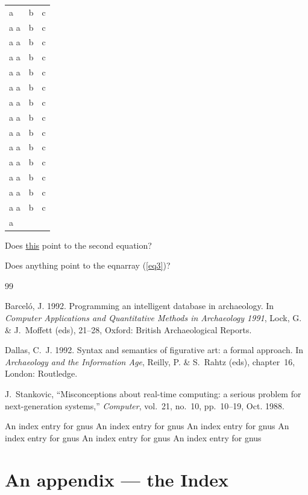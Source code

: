 \documentclass[11pt]{book}
\begin{document}
\begin{longtable}{lll}
a & b & c \\a
a & b & c \\a
a & b & c \\a
a & b & c \\a
a & b & c \\a
a & b & c \\a
a & b & c \\a
a & b & c \\a
a & b & c \\a
a & b & c \\a
a & b & c \\a
a & b & c \\a
a & b & c \\a
a & b & c \\a
\end{longtable}

Does \hyperref{}{equation}{2.2}{this} point to the second equation?

Does anything point to the eqnarray (\autoref{eq3})?

\begin{thebibliography}{99}
{Barcel\'o, J.} 1992.
\newblock Programming an intelligent database in archaeology. In \emph{Computer
  Applications and Quantitative Methods in Archaeology 1991}, {Lock, G. \&
  J.~Moffett} (eds),   21--28, Oxford: British Archaeological Reports.

{Dallas, C.~J.} 1992.
\newblock Syntax and semantics of figurative art: a formal approach. In
  \emph{Archaeology and the Information Age}, {Reilly, P. \& S.~Rahtz} (eds),
  chapter~16, London: Routledge.

J.~Stankovic, ``Misconceptions about real-time computing: a serious problem for
  next-generation systems,'' {\em Computer}, vol.~21, no.~10, pp.~10--19, Oct.
  1988.

\end{thebibliography}

\clearpage
An index entry for gnus
\clearpage
An index entry for gnus
\clearpage
An index entry for gnus
\clearpage
An index entry for gnus
\clearpage
An index entry for gnus
\clearpage
An index entry for gnus
\chapter*{An appendix --- the Index}
\printindex
\end{document}
